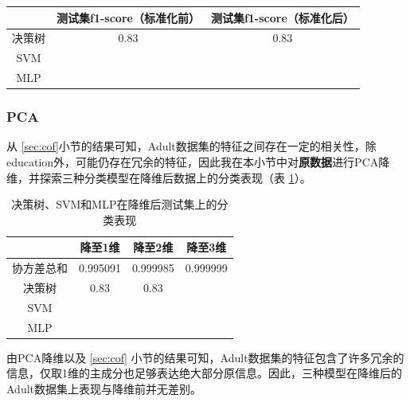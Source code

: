 \documentclass[12pt,a4paper]{article}
\theoremstyle{definition}
\begin{document}
{\begin{table}[H]
	\begin{tabular}{c|c|c}
		\centering
		 & 测试集f1-score（标准化前） & 测试集f1-score（标准化后） \\
		\hline
		\hline
		
		决策树 & 0.83 & 0.83 \\
		SVM & & \\
		MLP & & \\	

	\end{tabular}
\end{table}

\subsubsection{PCA}

从 \ref{sec:cof}小节的结果可知，Adult数据集的特征之间存在一定的相关性，除education外，可能仍存在冗余的特征，因此我在本小节中对\textbf{原数据}进行PCA降维，并探索三种分类模型在降维后数据上的分类表现（表 \ref{tab:pca1}）。

\begin{table}[H]
	\renewcommand\arraystretch{1.35}
	\caption{决策树、SVM和MLP在降维后测试集上的分类表现}
	\label{tab:pca1}
	\centering
	
	\begin{tabular}{c|c|c|c}
		\centering
		 & 降至1维 & 降至2维 & 降至3维 \\
		\hline
		\hline
		
		协方差总和 & 0.995091 & 0.999985 & 0.999999 \\
		决策树 & 0.83 & 0.83 & \\
		SVM & & & \\
		MLP & & & \\

	\end{tabular}
\end{table}

由PCA降维以及 \ref{sec:cof} 小节的结果可知，Adult数据集的特征包含了许多冗余的信息，仅取1维的主成分也足够表达绝大部分原信息。因此，三种模型在降维后的Adult数据集上表现与降维前并无差别。


}
\end{document}
